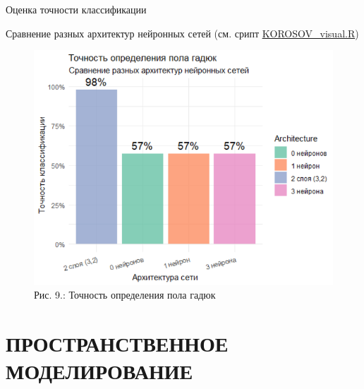 \documentclass[
  letterpaper,
  DIV=11,
  numbers=noendperiod]{scrreprt}
\newenvironment{Shaded}{\begin{snugshade}}{\end{snugshade}}
\newcommand{\DecValTok}[1]{\textcolor[rgb]{0.68,0.00,0.00}{#1}}
\newcommand{\FunctionTok}[1]{\textcolor[rgb]{0.28,0.35,0.67}{#1}}
\newcommand{\NormalTok}[1]{\textcolor[rgb]{0.00,0.23,0.31}{#1}}
\newcommand{\OtherTok}[1]{\textcolor[rgb]{0.00,0.23,0.31}{#1}}
\newcommand{\SpecialCharTok}[1]{\textcolor[rgb]{0.37,0.37,0.37}{#1}}
\newcommand{\StringTok}[1]{\textcolor[rgb]{0.13,0.47,0.30}{#1}}
\begin{document}
Оценка точности классификации

\begin{Shaded}
\end{Shaded}

Сравнение разных архитектур нейронных сетей (см. срипт
\href{https://mombus.github.io/cRab/data/KOROSOV_visual.R}{KOROSOV\_visual.R})

\begin{figure}[H]

{\centering \includegraphics[width=0.6\linewidth,height=\textheight,keepaspectratio]{images/KOROSOV9.PNG}

}

\caption{Рис. 9.: Точность определения пола гадюк}

\end{figure}%

\section{ПРОСТРАНСТВЕННОЕ
МОДЕЛИРОВАНИЕ}\label{ux43fux440ux43eux441ux442ux440ux430ux43dux441ux442ux432ux435ux43dux43dux43eux435-ux43cux43eux434ux435ux43bux438ux440ux43eux432ux430ux43dux438ux435}
\end{document}
